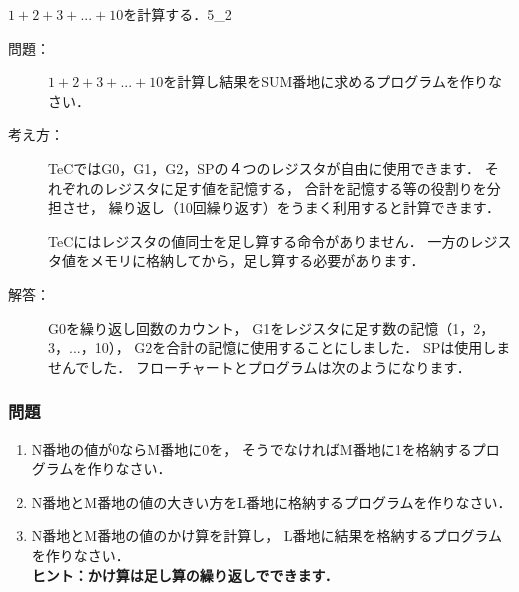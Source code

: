 \newpage
\begin{reidai}{$1 + 2 + 3 + ... + 10$を計算する．}{5_2}
\begin{description}
\item[問題：]
$1 + 2 + 3 + ... + 10$を計算し結果をSUM番地に求めるプログラムを作りなさい．

\item[考え方：]
TeCではG0，G1，G2，SPの４つのレジスタが自由に使用できます．
それぞれのレジスタに足す値を記憶する，
合計を記憶する等の役割りを分担させ，
繰り返し（10回繰り返す）をうまく利用すると計算できます．

TeCにはレジスタの値同士を足し算する命令がありません．
一方のレジスタ値をメモリに格納してから，足し算する必要があります．

\item[解答：]
G0を繰り返し回数のカウント，
G1をレジスタに足す数の記憶（1，2，3，...，10），
G2を合計の記憶に使用することにしました．
SPは使用しませんでした．
フローチャートとプログラムは次のようになります．

\begin{center}
\end{center}
\end{description}
\end{reidai}

\vfill
\subsubsection{問題}
\begin{enumerate}
\item N番地の値が0ならM番地に0を，
そうでなければM番地に1を格納するプログラムを作りなさい．
\item N番地とM番地の値の大きい方をL番地に格納するプログラムを作りなさい．
\item N番地とM番地の値のかけ算を計算し，
L番地に結果を格納するプログラムを作りなさい．\\
{\bf ヒント：かけ算は足し算の繰り返しでできます．}
\end{enumerate}
\vfill

